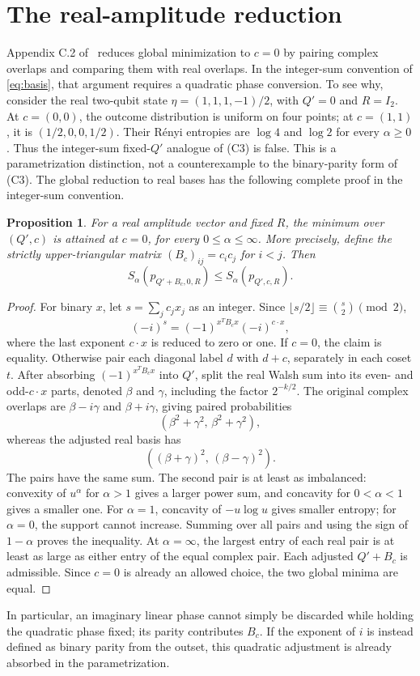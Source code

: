 \documentclass[11pt]{article}
\newtheorem{proposition}[theorem]{Proposition}
\begin{document}
\section{The real-amplitude reduction}
\label{sec:real}
Appendix C.2 of~\cite{posing} reduces global minimization to $c=0$
by pairing complex overlaps and comparing them with real overlaps.
In the integer-sum convention of \eqref{eq:basis}, that argument
requires a quadratic phase conversion. To see why, consider the real
two-qubit state $\eta=(1,1,1,-1)/2$, with $Q'=0$ and $R=I_2$.
At $c=(0,0)$, the outcome distribution is uniform on four points;
at $c=(1,1)$, it is $(1/2,0,0,1/2)$.
Their R\'enyi entropies are $\log4$ and $\log2$ for every $\alpha\ge0$.
Thus the integer-sum fixed-$Q'$ analogue of (C3) is false.
This is a parametrization distinction, not a counterexample to the
binary-parity form of (C3). The global reduction to real bases has the
following complete proof in the integer-sum convention.

\begin{proposition}\label{prop:real}
For a real amplitude vector and fixed $R$, the minimum over $(Q',c)$
is attained at $c=0$, for every $0\le\alpha\le\infty$.
More precisely, define the strictly upper-triangular matrix
$(B_c)_{ij}=c_ic_j$ for $i<j$. Then
\[
 S_\alpha(p_{Q'+B_c,0,R})\le S_\alpha(p_{Q',c,R}).
\]
\end{proposition}
\begin{proof}
For binary $x$, let $s=\sum_jc_jx_j$ as an integer.
Since $\lfloor s/2\rfloor\equiv\binom{s}{2}\pmod2$,
\[
 (-i)^s=(-1)^{x^TB_cx}(-i)^{c\cdot x},
\]
where the last exponent $c\cdot x$ is reduced to zero or one.
If $c=0$, the claim is equality. Otherwise pair each diagonal label $d$
with $d+c$, separately in each coset $t$. After absorbing
$(-1)^{x^TB_cx}$ into $Q'$, split the real Walsh sum into its even- and
odd-$c\cdot x$ parts, denoted $\beta$ and $\gamma$, including the
factor $2^{-k/2}$. The original complex overlaps are
$\beta-i\gamma$ and $\beta+i\gamma$, giving paired probabilities
\[
 (\beta^2+\gamma^2,\,\beta^2+\gamma^2),
\]
whereas the adjusted real basis has
\[
 ((\beta+\gamma)^2,\,(\beta-\gamma)^2).
\]
The pairs have the same sum. The second pair is at least as imbalanced:
convexity of $u^\alpha$ for $\alpha>1$ gives a larger power sum,
and concavity for $0<\alpha<1$ gives a smaller one.
For $\alpha=1$, concavity of $-u\log u$ gives smaller entropy;
for $\alpha=0$, the support cannot increase. Summing over all pairs
and using the sign of $1-\alpha$ proves the inequality.
At $\alpha=\infty$, the largest entry of each real pair is at least
as large as either entry of the equal complex pair.
Each adjusted $Q'+B_c$ is admissible. Since $c=0$ is already an allowed
choice, the two global minima are equal.
\end{proof}
In particular, an imaginary linear phase cannot simply be discarded while
holding the quadratic phase fixed; its parity contributes $B_c$.
If the exponent of $i$ is instead defined as binary parity from the outset,
this quadratic adjustment is already absorbed in the parametrization.
\end{document}
